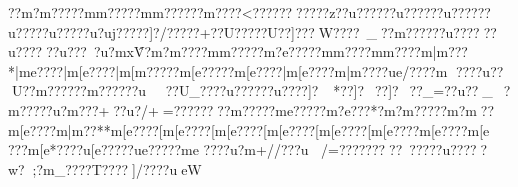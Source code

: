 {{{{{{{{{{{{{{{{{{{{{{{{{{{{{{{{{{{{{{{{{{{{{{{{{{{{{{{{{{{{{{{{{{{{{{{{{{{{{{{{{{{{{{{{{{{{{{{{{{{{{{{{{{{{{{{{{{{{{{{{{{{{{{{{{{{{{{{{{{{{{{{{{{{{{{{{{{{{{{{{{{{{{{{{{{{{{{{{{{{{{{{{{{{{{{{{{{{{{{{{{{{{{{{{{{{{{{{{{{{{{{{{{{{{{{{{{{{{{{{{{{{{{{{{{{{{{{{{{{{{{{{{{{{{{{{{{{{{{{{{{{{{{{{{{{{{{{{{{{{{{{{{{{{{{{{{{{{{{{{{{{{{{{{{{{{{{{{{{{{{{{{{{{{{{{{{{{{{{{{{{{{{??m?m?????m{m?????m{m?????}?m????<??}??????}???z?}?u?????}?u?????}?u?????}?u????}?u?????u?uj?????]?/????}?+??U??}? ??U??]???W}??}??~_??m?????}?u??????u??????u???~?u?mx\^V?m?m????m{m?????m?e?????m{m????m{m????{m|m???*|m{e????|m[e????|m[m?????m[e?????m[e????|m[e????{m|m??? ?u{e/????}{m
???}?u??U?}?m?????}?m?????}?u??}U_???}?u?????}?u????]?~*??]?~  ??]?~ ??_=??u??_~?m?????u?m???+??u?/+=???????}?m?????m{e?????m?e???*?m?m?????m?m  ??m[e????{m|m??**{m[e????[m[e????[m[e????[m[e????[m[e????[m[e????{m[e????{m[e
???{m[e*????u[e?????u{e?????m{e
????u?m+//??}?u
/=?????????}~????}?u???{??w?;?{m_? ???T????}]/????ueW\Z{e?d??e?dW???d?d_~???d?\??? Zmx\?????d?\?? Zm?dUU??zu?dU_z Zm?d????zu:e????zu:e????{???/??U?????{??z??{?{mU^p`?me????{meu???}eUU_ce?d??e?dU???e?d????e?d???:m?\?????}:e ?U?}?\????:m[e????:m{e??????e?/??[??u-?WU{?? -???[?j

}}}}}}}}}}}}}}}}}}}}}}}}}}}}}}}}}}}}}}}}}}}}}}}}}}}}}}}}}}}}}}}}}}}}}}}}}}}}}}}}}}}}}}}}}}}}}}}}}}}}}}}}}}}}}}}}}}}}}}}}}}}}}}}}}}}}}}}}}}}}}}}}}}}}}}}}}}}}}}}}}}}}}}}}}}}}}}}}}}}}}}}}}}}}}}}}}}}}}}}}}}}}}}}}}}}}}}}}}}}}}}}}}}}}}}}}}}}}}}}}}}}}}}}}}}}}}}}}}}}}}}}}}}}}}}}}}}}}}}}}}}}}}}}}}}}}}}}}}}}}}}}}}}}}}}}}}}}}}}}}}}}}}}}}}}}}}}}}}}}}}}}}}}}}}}}}}}}}}}}}}}}
